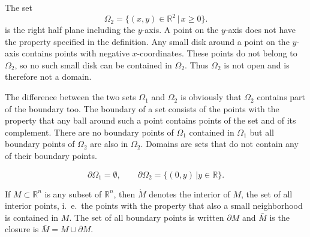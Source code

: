 \begin{beispiel}
The set
\[
\Omega_2 = \{ (x,y)\in\mathbb R^2\,|\, x\ge 0\}.
\]
is the right half plane including the $y$-axis.
A point on the $y$-axis does not have the property specified in the
definition.
Any small disk around a point on the $y$-axis contains points with negative
$x$-coordinates.
These points do not belong to $\Omega_2$, so no such small disk can be
contained in $\Omega_2$.
Thus $\Omega_2$ is not open and is therefore not a domain.
\end{beispiel}

The difference between the two sets $\Omega_1$ and $\Omega_2$ is
obviously that $\Omega_2$ contains part of the boundary too.
The boundary of a set consists of the points with the property that
any ball around such a point contains points of the set and of its
complement.
There are no boundary points of $\Omega_1$ contained in $\Omega_1$
but all boundary points of $\Omega_2$ are also in $\Omega_2$.
Domains are sets that do not contain any of their boundary points.

\begin{beispiel}
\[
\partial \Omega_1=\emptyset,\qquad\partial \Omega_2=\{(0,y)\,|y\in\mathbb R\}.
\]
\end{beispiel}

\begin{definition}
If $M\subset\mathbb R^n$ is any subset of $\mathbb R^n$,
then $\mathring M$ denotes the interior of $M$, the set of all interior
points, i.~e.~the points with the property that also a small neighborhood
is contained in $M$.
The set of all boundary points is written $\partial M$ and $\bar M$
is the closure is $\bar M=M\cup \partial M$.
\end{definition}

